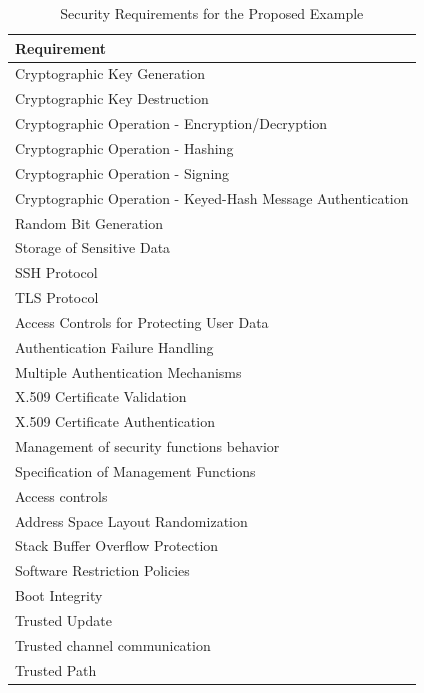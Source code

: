 \begin{table}[ht]
    \centering
    \begin{tabular}{||l||} 
     \hline
     \rowcolor{Gray}
     \textbf{Requirement} \\ [0.5ex] 
     \hline\hline
     Cryptographic Key Generation \\ 
     \hline
     Cryptographic Key Destruction \\
     \hline
     Cryptographic Operation - Encryption/Decryption \\
     \hline
     Cryptographic Operation - Hashing \\
     \hline
     Cryptographic Operation - Signing \\
     \hline
     Cryptographic Operation - Keyed-Hash Message Authentication\\
     \hline
     Random Bit Generation\\
     \hline
     Storage of Sensitive Data\\
     \hline
     SSH Protocol\\
     \hline
     TLS Protocol\\
     \hline
     Access Controls for Protecting User Data\\
     \hline
     Authentication Failure Handling\\
     \hline
     Multiple Authentication Mechanisms\\
     \hline
     X.509 Certificate Validation\\
     \hline
     X.509 Certificate Authentication\\
     \hline
     Management of security functions behavior\\
     \hline
     Specification of Management Functions\\
     \hline
     Access controls\\
     \hline
     Address Space Layout Randomization\\
     \hline
     Stack Buffer Overflow Protection\\
     \hline
    Software Restriction Policies\\
     \hline
     Boot Integrity\\
     \hline
     Trusted Update\\
     \hline
     Trusted channel communication\\
     \hline
     Trusted Path \\ [0.5ex]
     \hline
    \end{tabular}
    \caption{Security Requirements for the Proposed Example}
    \label{tab:SR}
\end{table}



